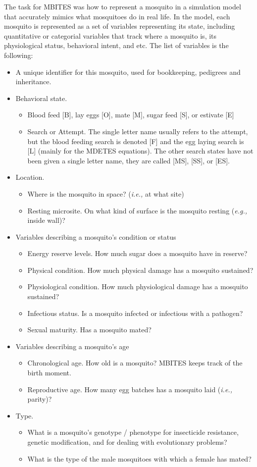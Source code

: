 \documentclass{article}
\newcommand{\eg}{{\em e.g., }}
\newcommand{\ie}{{\em i.e., }}
\begin{document}
The task for MBITES was how to represent a mosquito in a simulation model that accurately mimics what mosquitoes do in real life. In the model, each mosquito is represented as a set of variables representing its state, including quantitative or categorial variables that track where a mosquito is, its physiological status, behavioral intent, and etc. The list of variables is the following: 
%
\begin{itemize}
\item A unique identifier for this mosquito, used for bookkeeping, pedigrees and inheritance.
\item Behavioral state.
\begin{itemize} 
  \item Blood feed [B], lay eggs [O], mate [M], sugar feed [S], or estivate [E]
  \item Search or Attempt. The single letter name usually refers to the attempt, but the blood feeding search is denoted [F] and the egg laying search is [L] (mainly for the MDETES equations). The other search states have not been given a single letter name, they are called [MS], [SS], or [ES]. 
\end{itemize}
\item Location. 
\begin{itemize} 
\item Where is the mosquito in space? (\ie at what site) 
\item Resting microsite. On what kind of surface  is the mosquito resting (\eg inside wall)?
\end{itemize}
\item Variables describing a mosquito's condition or status
\begin{itemize}
\item Energy reserve levels. How much sugar does a mosquito have in reserve? 
\item Physical condition. How much physical damage has a mosquito sustained? 
\item Physiological condition. How much physiological damage has a mosquito sustained?
\item Infectious status. Is a mosquito infected or infectious with a pathogen? 
\item Sexual maturity. Has a mosquito mated? 
\end{itemize}
\item Variables describing a mosquito's age
\begin{itemize}
\item Chronological age. How old is a mosquito? MBITES keeps track of the birth moment. 
\item Reproductive age. How many egg batches has a mosquito laid (\ie parity)? 
\end{itemize}
\item Type. 
\begin{itemize}
\item What is a mosquito's genotype / phenotype for insecticide resistance, genetic modification, and for dealing with evolutionary problems?
\item What is the type of the male mosquitoes with which a female has mated?
\end{itemize}
\end{itemize}
\end{document}
